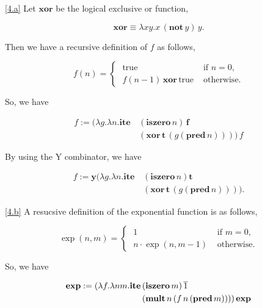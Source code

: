 \documentclass{homework}
\begin{document}
\begin{solution}

  \ref{4.a} Let $\mathbf{xor}$ be the logical exclusive or function,
  
  \begin{equation*}
  \mathbf{xor} \equiv \lambda xy.x\,(\mathbf{not}\, y)\, y.
  \end{equation*}

  Then we have a recursive definition of $f$ as follows,

  \begin{equation*}
    f(n)  = \begin{cases}\; \text{true} & \text{ if } n = 0,\\
              \; f(n-1)\, \mathbf{xor}\, \text{true} & \text{ otherwise.}\end{cases}
  \end{equation*}

  So, we have
  
  \begin{align*}
    f := (\lambda g.\lambda n.\mathbf{ite}\, & (\mathbf{iszero}\, n)\, \mathbf{f} \\
    & (\mathbf{xor}\, \mathbf{t}\,(g (\mathbf{pred}\, n))))\,f
  \end{align*}

  By using the Y combinator, we have
  
  \begin{align*}
    f := \mathbf{y}(\lambda g.\lambda n.\mathbf{ite}\, & (\mathbf{iszero}\, n) \mathbf{t} \\
    & (\mathbf{xor}\, \mathbf{t}\,(g (\mathbf{pred}\, n)))).
  \end{align*}

  \ref{4.b} A resucsive definition of the exponential function is as follows,

  \begin{equation*}
    \exp(n,m) = \begin{cases}\; 1 & \text{ if } m = 0,\\
              \; n\cdot \exp(n,m-1) & \text{ otherwise.}\end{cases}
  \end{equation*}

  So, we have
  
  \begin{align*}
    \mathbf{exp} := (\lambda f.\lambda nm. \mathbf{ite}\, & (\mathbf{iszero}\, m)\, \overline{1} \\
    & (\mathbf{mult}\, n\, (f\, n\, (\mathbf{pred}\, m) )))\, \mathbf{exp}
  \end{align*}


\end{solution}
\end{document}
